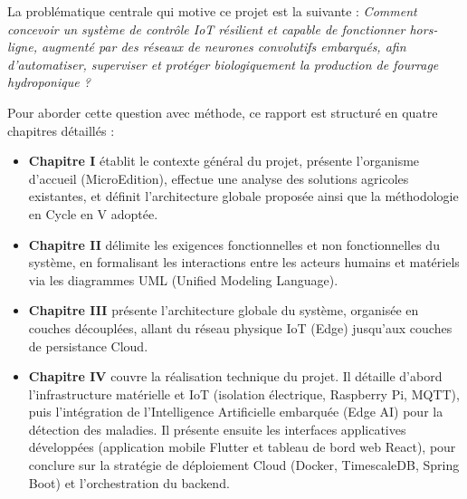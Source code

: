 La problématique centrale qui motive ce projet est la suivante : \textit{Comment concevoir un système de contrôle IoT résilient et capable de fonctionner hors-ligne, augmenté par des réseaux de neurones convolutifs embarqués, afin d'automatiser, superviser et protéger biologiquement la production de fourrage hydroponique ?}

Pour aborder cette question avec méthode, ce rapport est structuré en quatre chapitres détaillés :
\begin{itemize}
  \item \textbf{Chapitre I} établit le contexte général du projet, présente l'organisme d'accueil (MicroEdition), effectue une analyse des solutions agricoles existantes, et définit l'architecture globale proposée ainsi que la méthodologie en Cycle en V adoptée.
  \item \textbf{Chapitre II} délimite les exigences fonctionnelles et non fonctionnelles du système, en formalisant les interactions entre les acteurs humains et matériels via les diagrammes UML (Unified Modeling Language).
  \item \textbf{Chapitre III} présente l'architecture globale du système, organisée en couches découplées, allant du réseau physique IoT (Edge) jusqu'aux couches de persistance Cloud.
  \item \textbf{Chapitre IV} couvre la réalisation technique du projet. Il détaille d'abord l'infrastructure matérielle et IoT (isolation électrique, Raspberry Pi, MQTT), puis l'intégration de l'Intelligence Artificielle embarquée (Edge AI) pour la détection des maladies. Il présente ensuite les interfaces applicatives développées (application mobile Flutter et tableau de bord web React), pour conclure sur la stratégie de déploiement Cloud (Docker, TimescaleDB, Spring Boot) et l'orchestration du backend.
\end{itemize}